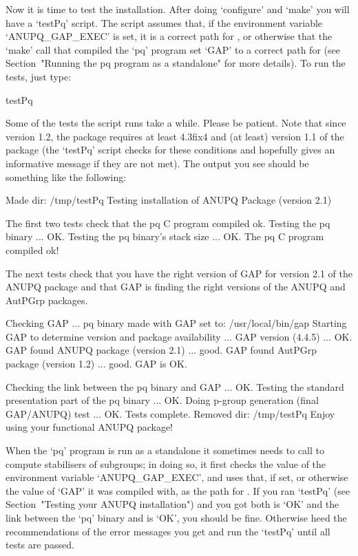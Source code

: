
Now it is time to test the  installation.  After  doing  `configure'  and
`make' you will have a `testPq' script. The script assumes that,  if  the
environment variable `ANUPQ_GAP_EXEC' is set, it is a  correct  path  for
{\GAP}, or otherwise that the `make' call that compiled the  `pq' program
set `GAP' to a correct path  for  {\GAP}  (see  Section~"Running  the  pq
program as a standalone" for more details). To run the tests, just type:

\begintt
testPq
\endtt

Some of the tests the script runs take a while. Please be  patient.  Note
that since version 1.2, the {\ANUPQ} package  requires  at  least  {\GAP}
4.3fix4 and (at  least)  version  1.1  of  the  {\AutPGrp}  package  (the
`testPq' script checks  for  these  conditions  and  hopefully  gives  an
informative message if they are not met). The output you  see  should  be
something like the following:

\begintt
Made dir: /tmp/testPq
Testing installation of ANUPQ Package (version 2.1)
 
The first two tests check that the pq C program compiled ok.
Testing the pq binary ... OK.
Testing the pq binary's stack size ... OK.
The pq C program compiled ok!
 
The next tests check that you have the right version of GAP
for version 2.1 of the ANUPQ package and that GAP is finding
the right versions of the ANUPQ and AutPGrp packages.
 
Checking GAP ...
 pq binary made with GAP set to: /usr/local/bin/gap
 Starting GAP to determine version and package availability ...
  GAP version (4.4.5) ... OK.
  GAP found ANUPQ package (version 2.1) ... good.
  GAP found AutPGrp package (version 1.2) ... good.
 GAP is OK.
 
Checking the link between the pq binary and GAP ... OK.
Testing the standard presentation part of the pq binary ... OK.
Doing p-group generation (final GAP/ANUPQ) test ... OK.
Tests complete.
Removed dir: /tmp/testPq
Enjoy using your functional ANUPQ package!
\endtt


When the `pq' program is run as a standalone it sometimes  needs  to call
{\GAP} to compute stabilisers of subgroups; in doing so, it first  checks
the value of the environment variable `ANUPQ_GAP_EXEC', and uses that, if
set, or otherwise the value of `GAP' it was compiled with,  as  the  path
for  {\GAP}.  If  you  ran  `testPq'  (see  Section~"Testing  your  ANUPQ
installation") and you got both {\GAP} is `OK' and the link  between  the
`pq' binary and {\GAP} is `OK', you should be fine.  Otherwise  heed  the
recommendations of the error messages you get and run the `testPq'  until
all tests are passed.

